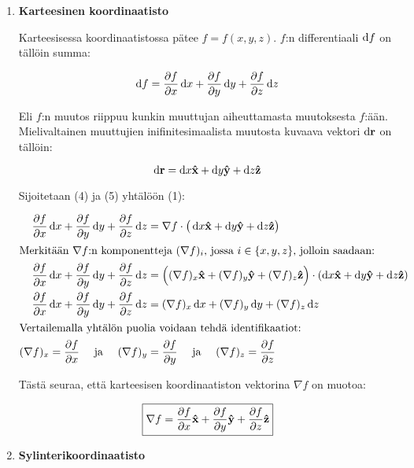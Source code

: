 \documentclass[../johdoksia.tex]{subfiles}
\begin{document}
	\begin{enumerate}
		\item \textbf{Karteesinen koordinaatisto}
		
		Karteesisessa koordinaatistossa pätee $f = f(x,y,z)$. $f$:n differentiaali $\odif{f}$ on tällöin summa:
		
		\begin{equation}
			\odif{f} = \pdv{f}{x}\odif{x} + \pdv{f}{y}\odif{y} + \pdv{f}{z}\odif{z}
		\end{equation}
		
		Eli $f$:n muutos riippuu kunkin muuttujan aiheuttamasta muutoksesta $f$:ään. Mielivaltainen muuttujien inifinitesimaalista muutosta kuvaava vektori $\odif{\vtr{r}}$ on tällöin:
		
		\begin{equation}
			\odif{\vtr{r}} = \odif{x}\unitv{x} + \odif{y}\unitv{y} + \odif{z}\unitv{z}
		\end{equation}
		
		Sijoitetaan (4) ja (5) yhtälöön (1):
		
		\begin{align}
			\pdv{f}{x}\odif{x} + \pdv{f}{y}\odif{y} + \pdv{f}{z}\odif{z} &= \nabla f \cdot \big(\odif{x}\unitv{x} + \odif{y}\unitv{y} + \odif{z}\unitv{z}\big) \\
			\intertext{Merkitään $\nabla f$:n komponentteja $(\nabla f)_i$, jossa $i \in \left\{x,y,z\right\}$, jolloin saadaan:}
			\pdv{f}{x}\odif{x} + \pdv{f}{y}\odif{y} + \pdv{f}{z}\odif{z} &= \Big((\nabla f)_x\unitv{x} + (\nabla f)_y\unitv{y} + (\nabla f)_z\unitv{z}\Big) \cdot (\odif{x}\unitv{x} + \odif{y}\unitv{y} + \odif{z}\unitv{z}) \\
			\pdv{f}{x}\odif{x} + \pdv{f}{y}\odif{y} + \pdv{f}{z}\odif{z} &= (\nabla f)_x\odif{x} + (\nabla f)_y\odif{y} + (\nabla f)_z\odif{z} \\
			\intertext{Vertailemalla yhtälön puolia voidaan tehdä identifikaatiot:}
			(\nabla f)_x = \pdv{f}{x} \ \ \ \ \text{ja} \ \ \ \ (\nabla f)_y &= \pdv{f}{y} \ \ \ \ \text{ja} \ \ \ \ (\nabla f)_z = \pdv{f}{z}
		\end{align}
		
		\noindent Tästä seuraa, että karteesisen koordinaatiston vektorina $\nabla f$ on muotoa:
		
		\begin{equation}
			\boxed{\nabla f = \pdv{f}{x}\mathbf{\hat{x}} + \pdv{f}{y}\mathbf{\hat{y}} + \pdv{f}{z}\mathbf{\hat{z}}}
		\end{equation}
		
		\item \textbf{Sylinterikoordinaatisto}
		

\end{enumerate}
\end{document}
